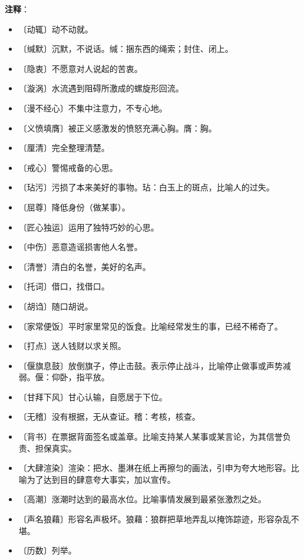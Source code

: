 \documentclass[12pt,UTF-8,openany]{ctexbook}
\begin{document}
\newpage

\textbf{注释}：

\vspace{-1em}

\begin{itemize}
    \setlength\itemsep{-0.2em}
    \item 〔动辄〕动不动就。
    \item 〔缄默〕沉默，不说话。缄：捆东西的绳索；封住、闭上。
    \item 〔隐衷〕不愿意对人说起的苦衷。
    \item 〔漩涡〕水流遇到阻碍所激成的螺旋形回流。
    \item 〔漫不经心〕不集中注意力，不专心地。
    \item 〔义愤填膺〕被正义感激发的愤怒充满心胸。膺：胸。
    \item 〔厘清〕完全整理清楚。
    \item 〔戒心〕警惕戒备的心思。
    \item 〔玷污〕污损了本来美好的事物。玷：白玉上的斑点，比喻人的过失。
    \item 〔屈尊〕降低身份（做某事）。
    \item 〔匠心独运〕运用了独特巧妙的心思。
    \item 〔中伤〕恶意造谣损害他人名誉。
    \item 〔清誉〕清白的名誉，美好的名声。
    \item 〔托词〕借口，找借口。
    \item 〔胡诌〕随口胡说。
    \item 〔家常便饭〕平时家里常见的饭食。比喻经常发生的事，已经不稀奇了。
    \item 〔打点〕送人钱财以求关照。
    \item 〔偃旗息鼓〕放倒旗子，停止击鼓。表示停止战斗，比喻停止做事或声势减弱。偃：仰卧，指平放。
    \item 〔甘拜下风〕甘心认输，自愿居于下位。
    \item 〔无稽〕没有根据，无从查证。稽：考核，核查。
    \item 〔背书〕在票据背面签名或盖章。比喻支持某人某事或某言论，为其信誉负责、担保真实。
    \item 〔大肆渲染〕渲染：把水、墨淋在纸上再擦匀的画法，引申为夸大地形容。比喻为了达到目的肆意夸大事实，加以宣传。
    \item 〔高潮〕涨潮时达到的最高水位。比喻事情发展到最紧张激烈之处。
    \item 〔声名狼藉〕形容名声极坏。狼藉：狼群把草地弄乱以掩饰踪迹，形容杂乱不堪。
    \item 〔历数〕列举。
\end{itemize}
\end{document}

